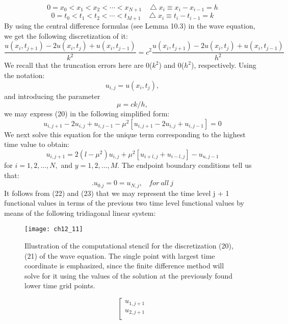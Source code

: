 \documentclass[../main.tex]{subfiles}
\begin{document}
{{$$0=x_0 < x_1 <x_2< \cdots<x_{N+1} ~~~~\bigtriangleup x_i \equiv x_i-x_{i-1}=h $$
\begin{equation}
	0=t_0 < t_1 <t_2< \cdots<t_{M+1} ~~~~\bigtriangleup x_i \equiv t_i-t_{i-1}=k
\end{equation}
By using the central difference formulas (see Lemma 10.3) in the wave equation, 
we get the following discretization of it: 
\begin{equation}
	\dfrac{u(x_i,t_{j+1})-2u(x_i,t_j)+u(x_i,t_{j-1})}{k^2}=
	c^2 \dfrac{u(x_i,t_{j+1})-2u(x_i,t_j)+u(x_i,t_{j-1})}{h^2}
\end{equation}
We recall that the truncation errors here are 0($k^2$) and 0($h^2$), respectively. Using the notation: 
$$u_{i,j}=u(x_i, t_j),$$
and introducing the parameter
 \begin{equation}
	\mu =ck/h,
\end{equation}
we may express (20) in the following simplified form:
 \begin{equation}
	u_{i,j+1}-2u_{i,j}+u_{i,j-1}-\mu^2[u_{i,j+1}-2u_{i,j}+u_{i,j-1}]=0
\end{equation}
We next solve this equation for the unique term corresponding to the highest time value to obtain: 
 \begin{equation}
	u_{i,j+1}=2(l- \mu^2)u_{i,j}+ \mu^2[u_{i+l,j}+u_{i-l,j}]-u_{u,j-1}
\end{equation}
for $i = 1,2, ...,N,$ and $y = 1, 2, ..., M$. The endpoint boundary conditions tell us that: 
 \begin{equation}
	.u_{0.j}=0=u_{N,j}, ~~~~ for ~all~j
\end{equation}
It follows from (22) and (23) that we may represent the time level j + 1 functional values in terms of the previous two time level functional values by means of the following tridiagonal linear system: 
\begin{figure}[H]
	\centering
	\texttt{[image: ch12\_11]}
	\caption{\textsf{Illustration of the computational stencil for the discretization (20), (21) of 
the wave equation. The single point with largest time coordinate is emphasized, since the 
finite difference method will solve for it using the values of the solution at the previously 
found lower time grid points. }}
	\label{pfig:ch12_11}
\end{figure}
\begin{equation}
\left[\begin{array}{c}
u_{1,j+1}\\
u_{2,j+1}\\

\end{array}
\end{equation}}}
\end{document}
